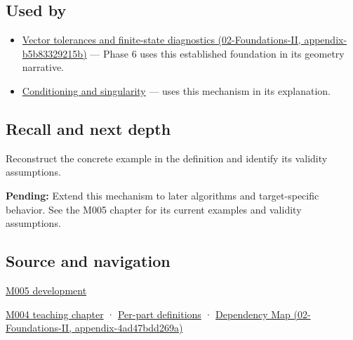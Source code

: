 \subsection{Used by}\label{used-by}

\begin{itemize}
\item
  \href{}{Vector tolerances and finite-state diagnostics (02-Foundations-II, appendix-b5b83329215b)} --- Phase 6 uses this established foundation in its geometry narrative.
\item
  \hyperref[appendix-8f6a01f284a7]{Conditioning and singularity} --- uses this mechanism in its explanation.
\end{itemize}

\subsection{Recall and next depth}\label{recall-and-next-depth}

Reconstruct the concrete example in the definition and identify its validity assumptions.

\textbf{Pending:} Extend this mechanism to later algorithms and target-specific behavior. See the M005 chapter for its current examples and validity assumptions.

\subsection{Source and navigation}\label{source-and-navigation}

\href{Continuous\%20Notes/Computing\%20Foundations\%20-\%20From\%20Bits\%20to\%20C++\%20and\%20Systems\%20APIs\#When\%20arithmetic\%20meets\%20uncertainty}{M005 development}

\href{Continuous\%20Notes/Computing\%20Foundations\%20-\%20From\%20Bits\%20to\%20C++\%20and\%20Systems\%20APIs\#A\%20stretching\%20ruler\%20for\%20real-valued\%20quantities}{M004 teaching chapter} · \hyperref[appendix-fd090d982a15]{Per-part definitions} · \href{}{Dependency Map (02-Foundations-II, appendix-4ad47bdd269a)}
